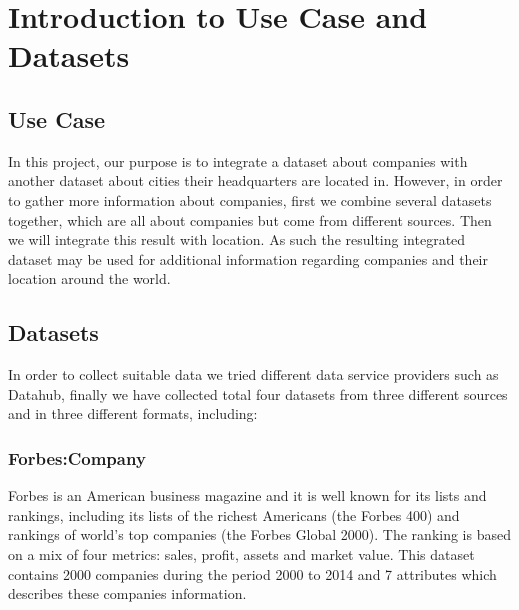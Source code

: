 \section{Introduction to Use Case and Datasets}
\subsection{Use Case}
In this project, our purpose is to integrate a dataset about companies with another dataset about cities their headquarters are located in. However, in order to gather more information about companies, first we combine several datasets together, which are all about companies but come from different sources. Then we will integrate this result with location. As such the resulting integrated dataset may be used for additional information regarding companies and their location around the world.

%

\subsection{Datasets}
In order to collect suitable data we tried different data service providers such as Datahub, finally we have collected total four datasets from three different sources and in three different formats, including: 
\subsubsection{Forbes:Company}
Forbes is an American business magazine and it is well known for its lists and rankings, including its lists of the richest Americans (the Forbes 400) and rankings of world's top companies (the Forbes Global 2000). The ranking is based on a mix of four metrics: sales, profit, assets and market value. This dataset contains 2000 companies during the period 2000 to 2014 and 7 attributes which describes these companies information.
